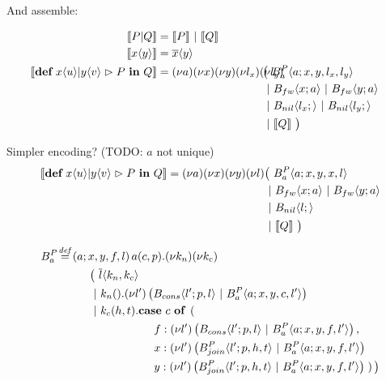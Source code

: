 
And assemble:

\begin{align*}
  \encMJtoAP{P \jpar Q}
  &= \encMJtoAP{P} \apar \encMJtoAP{Q}
  \\
  \encMJtoAP{\jsnd{x}{y}}
  &= \asnd{x}{y}
  \\
  \encMJtoAP{\jdef{\jrct{\jrcv{x}{u} \jpat \jrcv{y}{v}}{P}}{Q}}
  &=
  \anew{a}{\anew{x}{\anew{y}{\anew{l_x}{\anew{l_y}{
    \hspace{-1cm}&&\big(\ \ains{B_a^P}{a}{x, y, l_x, l_y} \\ %
    &&&\apar \ains{B_{fw}}{x}{a} \apar \ains{B_{fw}}{y}{a} \\
    &&&\apar \ains{B_{nil}}{l_x}{} \apar \ains{B_{nil}}{l_y}{} \\
    &&&\apar \encMJtoAP{Q}\ \big)
  }}}}}
\end{align*}


Simpler encoding? (TODO: $a$ not unique)
\begin{align*}
  \encMJtoAP{\jdef{\jrct{\jrcv{x}{u} \jpat \jrcv{y}{v}}{P}}{Q}}
  = \anew{a}{\anew{x}{\anew{y}{\anew{l}{
    &\big(\ \ains{B_a^P}{a}{x, y, x, l} \\
    &\apar \ains{B_{fw}}{x}{a} \apar \ains{B_{fw}}{y}{a} \\
    &\apar \ains{B_{nil}}{l}{} \\
    &\apar \encMJtoAP{Q}
  \ \big)}}}} \\
\end{align*}

\begin{align*}
  \adef*{B_a^P}{a}{x,y,f,l}{\arcv{a}{c,p} . \anew{k_n}{\anew{k_c}{
  \\ & \hspace{1cm}
    \big(\ \asnd{l}{k_n,k_c}
  \\ & \hspace{1cm}
    \apar \arcv{k_n}{} . \anew{l'}{\parens{\ains{B_{cons}}{l'}{p, l} \apar \ains{B_a^P}{a}{x, y, c, l'}}}
  \\ & \hspace{1cm}
    \apar \arcv{k_c}{h,t} . \acse{c}{\right.
  \\ & \hspace{3cm}
    \aalt{f}{\anew{l'}{\parens{\ains{B_{cons}}{l'}{p, l} \apar \ains{B_a^P}{a}{x, y, f, l'}}}},
  \\ & \hspace{3cm}
    \aalt{x}{\anew{l'}{\parens{\ains{B_{join}^P}{l'}{p, h, t} \apar \ains{B_a^P}{a}{x, y, f, l'}}}}
  \\ & \hspace{3cm}
    \aalt{y}{\anew{l'}{\parens{\ains{B_{join}^P}{l'}{p, h, t} \apar \ains{B_a^P}{a}{x, y, f, l'}}}}
    \left.}\big)
  }}} \\
\end{align*}



